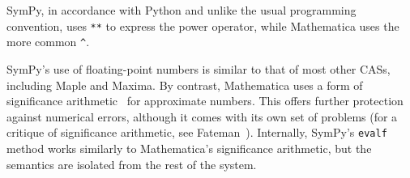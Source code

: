 
SymPy, in accordance with Python and unlike the usual programming convention,
uses \texttt{**} to express the power operator, while Mathematica uses the more
common \verb|^|.


SymPy's use of floating-point numbers is similar to that of most
other CASs, including Maple and Maxima.
By contrast, Mathematica uses a form
of significance arithmetic~\cite{Sofroniou2005precise} for approximate numbers.
This offers further protection against numerical errors,
although it comes with its own set of problems
(for a critique of significance arithmetic, see Fateman~\cite{Fateman1992}).
Internally, SymPy's \texttt{evalf} method works similarly to Mathematica's
significance arithmetic, but the semantics are isolated from the rest of the system.
